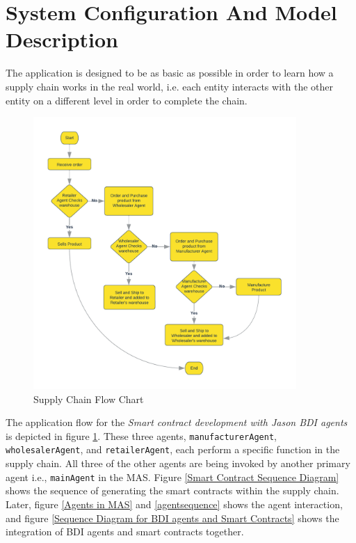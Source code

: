 \section{System Configuration And Model Description}

The application is designed to be as basic as possible in order to learn how a supply chain works in the real world, i.e. each entity interacts with the other entity on a different level in order to complete the chain.

    \begin{figure}[h]
    \centering
      \includegraphics[width=10cm]{includes/figures/Flow Chart.png}
      \caption{Supply Chain Flow Chart}
      \label{Flow chart}
    \end{figure}

\vspace{.5cm}

The application flow for the \textit{Smart contract development with Jason \ac{BDI} agents} is depicted in figure \ref{Flow chart}. These three agents, \texttt{manufacturerAgent}, \texttt{wholesalerAgent}, and \texttt{retailerAgent}, each perform a specific function in the supply chain. All three of the other agents are being invoked by another primary agent i.e., \texttt{mainAgent} in the \ac{MAS}. Figure 
 \ref{Smart Contract Sequence Diagram}  shows the sequence of generating the smart contracts within the supply chain.
Later, figure \ref{Agents in MAS} and \ref{agentsequence} shows the agent interaction, and figure \ref{Sequence Diagram for BDI agents and Smart Contracts} shows the integration of \ac{BDI} agents and smart contracts together.

